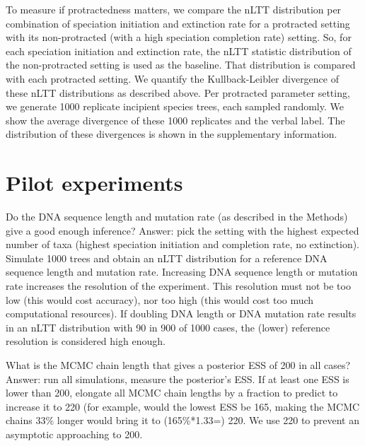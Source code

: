 \documentclass{article}
\begin{document}
To measure if protractedness matters, we compare the nLTT distribution per
combination of speciation initiation and extinction rate for a protracted
setting with its non-protracted (with a high speciation completion 
rate) setting. So, for each speciation initiation and extinction rate, 
the nLTT statistic distribution of the 
non-protracted setting is used as the baseline. That distribution is compared
with each protracted setting. We quantify the Kullback-Leibler divergence 
of these nLTT distributions as described above. Per protracted parameter setting, 
we generate 1000 replicate incipient species trees, each sampled randomly. We show the 
average divergence of these 1000 replicates and the verbal label.
The distribution of these divergences is shown in the supplementary information.

\section{Pilot experiments}

Do the DNA sequence length and mutation rate (as described in the Methods)
give a good enough inference? Answer: pick the setting with the highest
expected number of taxa (highest speciation initiation and completion rate, 
no extinction). Simulate 1000 trees and obtain an nLTT distribution for a
reference DNA sequence length and mutation rate. Increasing DNA sequence length
or mutation rate increases the resolution of the experiment. This resolution
must not be too low (this would cost accuracy), nor too high (this would cost
too much computational resources). If doubling DNA length or DNA mutation rate
results in an nLTT distribution with 90%
in 900 of 1000 cases, the (lower) reference resolution is considered high enough.

What is the MCMC chain length that gives a posterior ESS of 200 in all cases?
Answer: run all simulations, measure the posterior's ESS. If at least one 
ESS is lower than 200, elongate all MCMC chain lengths by a fraction 
to predict to increase it to 220 (for example, would the lowest ESS be 165, 
making the MCMC chains 33\% longer would bring it to (165\%*1.33=) 220. We use
220 to prevent an asymptotic approaching to 200. 

\end{document}
